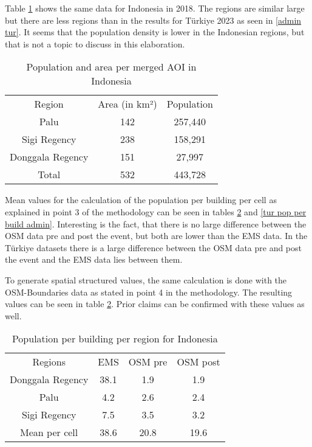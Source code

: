 \documentclass[oneside,twocolumn,10pt,cleanfoot,cleanhead]{asme2ej}
\begin{document}
Table \ref{admin ind} shows the same data for Indonesia in 2018.
The regions are similar large but there are less regions than in the results for Türkiye 2023 as seen in \ref{admin tur}.
It seems that the population density is lower in the Indonesian regions, but that is not a topic to discuss in this elaboration.

\begin{table}
    \caption{Population and area per merged AOI in Indonesia}
    \begin{center}
        \label{admin ind}
        \begin{tabular}{c c c}
            & & \\ %
            \hline
            Region & Area (in km²) & Population \\
            \hline
            Palu & 142 & 257,440 \\
            Sigi Regency & 238 & 158,291 \\
            Donggala Regency & 151 & 27,997 \\
            \hline
            Total & 532 & 443,728 \\
            \hline
        \end{tabular}
    \end{center}
\end{table}

Mean values for the calculation of the population per building per cell as explained in point 3 of the methodology can be seen in tables \ref{ind pop per build admin} and \ref{tur pop per build admin}. 
Interesting is the fact, that there is no large difference between the OSM data pre and post the event, but both are lower than the EMS data.
In the Türkiye datasets there is a large difference between the OSM data pre and post the event and the EMS data lies between them.

To generate spatial structured values, the same calculation is done with the OSM-Boundaries data as stated in point 4 in the methodology.
The resulting values can be seen in table \ref{ind pop per build admin}.
Prior claims can be confirmed with these values as well.

\begin{table}[ht]
    \caption{Population per building per region for Indonesia}
    \begin{center}
        \label{ind pop per build admin}
        \begin{tabular}{c c c c}
            & & \\ %
            \hline
            Regions & EMS & OSM pre & OSM post \\
            \hline
            Donggala Regency & 38.1 & 1.9 & 1.9 \\
            Palu & 4.2 & 2.6 & 2.4 \\
            Sigi Regency & 7.5 & 3.5 & 3.2 \\
            \hline
            Mean per cell & 38.6 & 20.8 & 19.6 \\
            \hline
        \end{tabular}
    \end{center}
\end{table}
\end{document}
